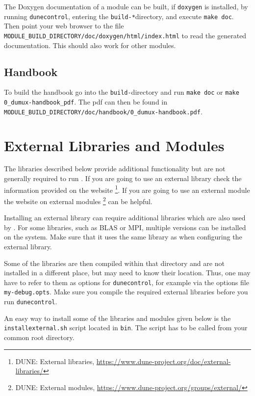 The Doxygen documentation of a module can be built, if \texttt{doxygen} is installed,
by running \texttt{dunecontrol}, entering the \texttt{build-*}directory, and execute
\texttt{make doc}. Then point your web browser to the file
\texttt{MODULE\_BUILD\_DIRECTORY/doc/doxygen/html/index.html} to read the generated documentation.
This should also work for other \Dune modules.

\subsection{Handbook}
To build the \Dumux handbook go into the \texttt{build-}directory and
run \texttt{make doc} or \texttt{make 0\_dumux-handbook\_pdf}. The pdf can then be found
in \texttt{MODULE\_BUILD\_DIRECTORY/doc/handbook/0\_dumux-handbook.pdf}.

\section{External Libraries and Modules} \label{sec:external-modules-libraries}
The libraries described below provide additional functionality but are not generally required to run \Dumux.
If you are going to use an external library check the information provided on the \Dune website%
\footnote{DUNE: External libraries, \url{https://www.dune-project.org/doc/external-libraries/}}.
If you are going to use an external \Dune module the website on external modules%
\footnote{DUNE: External modules, \url{https://www.dune-project.org/groups/external/}}
can be helpful.

Installing an external library can require additional libraries which are also used by \Dune.
For some libraries, such as BLAS or MPI, multiple versions can be installed on the system.
Make sure that it uses the same library as \Dune when configuring the external library.

Some of the libraries are then compiled within that directory and are not installed in
a different place, but \Dune may need to know their location. Thus, one may have to refer to
them as options for \texttt{dunecontrol}, for example via the options file \texttt{my-debug.opts}.
Make sure you compile the required external libraries before you run \texttt{dunecontrol}.

An easy way to install some of the libraries and modules given below is the
\texttt{installexternal.sh} script located in \texttt{bin}. The script
has to be called from your common root directory.



